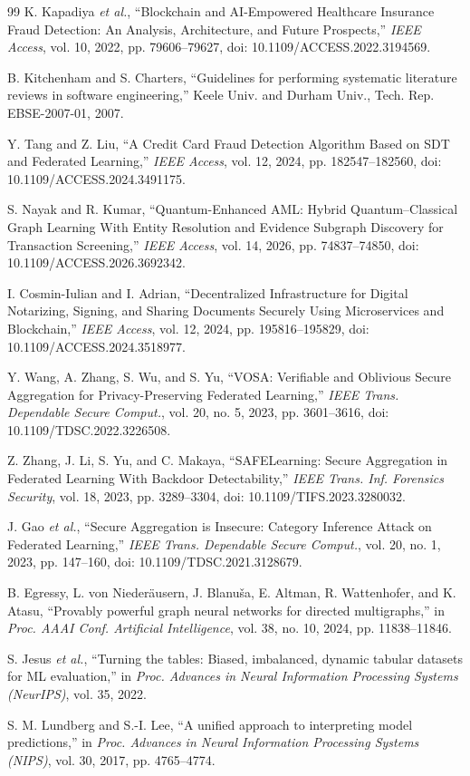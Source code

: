 \documentclass[journal]{IEEEtran}
\begin{document}
\begin{thebibliography}{99}
K. Kapadiya \emph{et al.}, ``Blockchain and AI-Empowered Healthcare Insurance Fraud Detection: An Analysis, Architecture, and Future Prospects,'' \emph{IEEE Access}, vol. 10, 2022, pp. 79606--79627, doi: 10.1109/ACCESS.2022.3194569.

B. Kitchenham and S. Charters, ``Guidelines for performing systematic literature reviews in software engineering,'' Keele Univ. and Durham Univ., Tech. Rep. EBSE-2007-01, 2007.

Y. Tang and Z. Liu, ``A Credit Card Fraud Detection Algorithm Based on SDT and Federated Learning,'' \emph{IEEE Access}, vol. 12, 2024, pp. 182547--182560, doi: 10.1109/ACCESS.2024.3491175.

S. Nayak and R. Kumar, ``Quantum-Enhanced AML: Hybrid Quantum--Classical Graph Learning With Entity Resolution and Evidence Subgraph Discovery for Transaction Screening,'' \emph{IEEE Access}, vol. 14, 2026, pp. 74837--74850, doi: 10.1109/ACCESS.2026.3692342.

I. Cosmin-Iulian and I. Adrian, ``Decentralized Infrastructure for Digital Notarizing, Signing, and Sharing Documents Securely Using Microservices and Blockchain,'' \emph{IEEE Access}, vol. 12, 2024, pp. 195816--195829, doi: 10.1109/ACCESS.2024.3518977.

Y. Wang, A. Zhang, S. Wu, and S. Yu, ``VOSA: Verifiable and Oblivious Secure Aggregation for Privacy-Preserving Federated Learning,'' \emph{IEEE Trans. Dependable Secure Comput.}, vol. 20, no. 5, 2023, pp. 3601--3616, doi: 10.1109/TDSC.2022.3226508.

Z. Zhang, J. Li, S. Yu, and C. Makaya, ``SAFELearning: Secure Aggregation in Federated Learning With Backdoor Detectability,'' \emph{IEEE Trans. Inf. Forensics Security}, vol. 18, 2023, pp. 3289--3304, doi: 10.1109/TIFS.2023.3280032.

J. Gao \emph{et al.}, ``Secure Aggregation is Insecure: Category Inference Attack on Federated Learning,'' \emph{IEEE Trans. Dependable Secure Comput.}, vol. 20, no. 1, 2023, pp. 147--160, doi: 10.1109/TDSC.2021.3128679.

B. Egressy, L. von Nieder\"ausern, J. Blanu\v{s}a, E. Altman, R. Wattenhofer, and K. Atasu, ``Provably powerful graph neural networks for directed multigraphs,'' in \emph{Proc. AAAI Conf. Artificial Intelligence}, vol. 38, no. 10, 2024, pp. 11838--11846.

S. Jesus \emph{et al.}, ``Turning the tables: Biased, imbalanced, dynamic tabular datasets for ML evaluation,'' in \emph{Proc. Advances in Neural Information Processing Systems (NeurIPS)}, vol. 35, 2022.

S. M. Lundberg and S.-I. Lee, ``A unified approach to interpreting model predictions,'' in \emph{Proc. Advances in Neural Information Processing Systems (NIPS)}, vol. 30, 2017, pp. 4765--4774.

\end{thebibliography}
\end{document}
